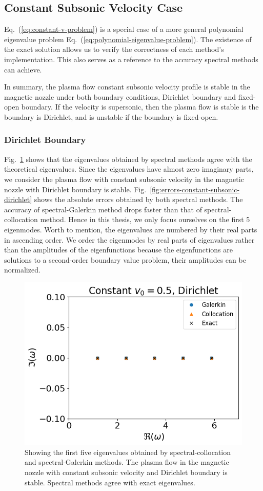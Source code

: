 \subsection{Constant Subsonic Velocity Case}
Eq.~(\ref{eq:constant-v-problem}) is a special case of a more general polynomial eigenvalue problem Eq.~(\ref{eq:polynomial-eigenvalue-problem}). The existence of the exact solution allows us to verify the correctness of each method's implementation. This also serves as a reference to the accuracy spectral methods can achieve.

In summary, the plasma flow constant subsonic velocity profile is stable in the magnetic nozzle under both boundary conditions, Dirichlet boundary and fixed-open boundary. If the velocity is supersonic, then the plasma flow is stable is the boundary is Dirichlet, and is unstable if the boundary is fixed-open.

\subsubsection*{Dirichlet Boundary}
Fig.~\ref{fig:constant-subsonic-dirichlet} shows that the eigenvalues obtained by spectral methods agree with the theoretical eigenvalues. Since the eigenvalues have almost zero imaginary parts, we consider the plasma flow with constant subsonic velocity in the magnetic nozzle with Dirichlet boundary is stable. Fig.~\ref{fig:errors-constant-subsonic-dirichlet} shows the absolute errors obtained by both spectral methods. The accuracy of spectral-Galerkin method drops faster than that of spectral-collocation method. Hence in this thesis, we only focus ourselves on the first 5 eigenmodes. Worth to mention, the eigenvalues are numbered by their real parts in ascending order. We order the eigenmodes by real parts of eigenvalues rather than the amplitudes of the eigenfunctions because the eigenfunctions are solutions to a second-order boundary value problem, their amplitudes can be normalized.

\begin{figure}[htpb]
	\centering
	\includegraphics[width=0.7\linewidth]{figures/constant-subsonic-dirichlet.png}
	\caption{Showing the first five eigenvalues obtained by spectral-collocation and spectral-Galerkin methods. The plasma flow in the magnetic nozzle with constant subsonic velocity and Dirichlet boundary is stable. Spectral methods agree with exact eigenvalues.}
	\label{fig:constant-subsonic-dirichlet}
\end{figure}

